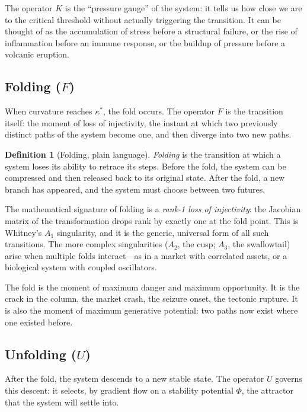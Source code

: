 \documentclass[12pt, oneside]{book}
\theoremstyle{plain}
\theoremstyle{definition}
\newtheorem{definition}{Definition}[chapter]
\theoremstyle{remark}
\begin{document}
The operator $K$ is the ``pressure gauge'' of the system: it
tells us how close we are to the critical threshold without
actually triggering the transition. It can be thought of as
the accumulation of stress before a structural failure, or the
rise of inflammation before an immune response, or the buildup
of pressure before a volcanic eruption.

\subsection{Folding ($F$)}

When curvature reaches $\kappa^*$, the fold occurs. The operator
$F$ is the transition itself: the moment of loss of injectivity,
the instant at which two previously distinct paths of the system
become one, and then diverge into two new paths.

\begin{definition}[Folding, plain language]
\emph{Folding} is the transition at which a system loses its
ability to retrace its steps. Before the fold, the system can
be compressed and then released back to its original state.
After the fold, a new branch has appeared, and the system must
choose between two futures.
\end{definition}

The mathematical signature of folding is a \emph{rank-1 loss
of injectivity}: the Jacobian matrix of the transformation
drops rank by exactly one at the fold point. This is Whitney's
$A_1$ singularity, and it is the generic, universal form of
all such transitions. The more complex singularities ($A_2$,
the cusp; $A_3$, the swallowtail) arise when multiple folds
interact---as in a market with correlated assets, or a
biological system with coupled oscillators.

The fold is the moment of maximum danger and maximum opportunity.
It is the crack in the column, the market crash, the seizure
onset, the tectonic rupture. It is also the moment of maximum
generative potential: two paths now exist where one existed before.

\subsection{Unfolding ($U$)}

After the fold, the system descends to a new stable state.
The operator $U$ governs this descent: it selects, by gradient
flow on a stability potential $\Phi$, the attractor that the
system will settle into.
\end{document}

